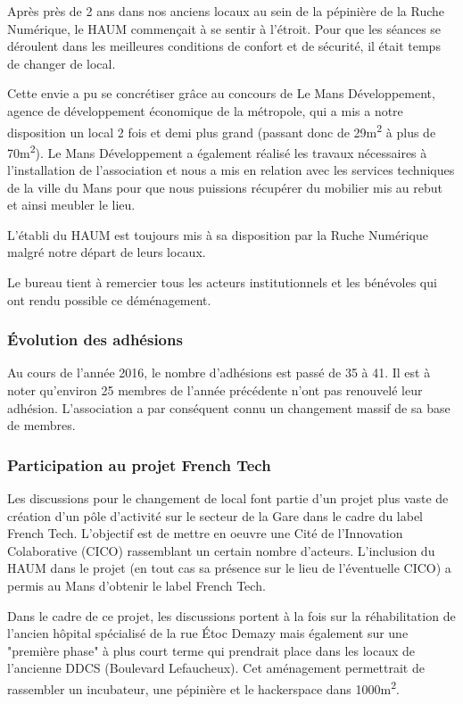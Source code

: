 \documentclass[11pt]{article}
\begin{document}
Après près de 2 ans dans nos anciens locaux au sein de la pépinière de la Ruche Numérique, le HAUM commençait à se sentir à l'étroit. Pour que les séances se déroulent dans les meilleures conditions de confort et de sécurité, il était temps de changer de local.

Cette envie a pu se concrétiser grâce au concours de Le Mans Développement, agence de développement économique de la métropole, qui a mis a notre disposition un local 2 fois et demi plus grand (passant donc de 29m\textsuperscript{2} à plus de 70m\textsuperscript{2}). Le Mans Développement a également réalisé les travaux nécessaires à l'installation de l'association et nous a mis en relation avec les services techniques de la ville du Mans pour que nous puissions récupérer du mobilier mis au rebut et ainsi meubler le lieu.

L'établi du HAUM est toujours mis à sa disposition par la Ruche Numérique malgré notre départ de leurs locaux.

Le bureau tient à remercier tous les acteurs institutionnels et les bénévoles qui ont rendu possible ce déménagement.

\subsubsection{Évolution des adhésions}

Au cours de l'année 2016, le nombre d'adhésions est passé de 35 à 41.
Il est à noter qu'environ 25 membres de l'année précédente n'ont pas renouvelé leur adhésion. L'association a par conséquent connu un changement massif de sa base de membres.

\subsubsection{Participation au projet French Tech}

Les discussions pour le changement de local font partie d'un projet plus vaste de création d'un pôle d'activité sur le secteur de la Gare dans le cadre du label French Tech. L'objectif est de mettre en oeuvre une Cité de l'Innovation Colaborative (CICO) rassemblant un certain nombre d'acteurs. L'inclusion du HAUM dans le projet (en tout cas sa présence sur le lieu de l'éventuelle CICO) a permis au Mans d'obtenir le label French Tech.

Dans le cadre de ce projet, les discussions portent à la fois sur la réhabilitation de l'ancien hôpital spécialisé de la rue Étoc Demazy mais également sur une "première phase" à plus court terme qui prendrait place dans les locaux de l'ancienne DDCS (Boulevard Lefaucheux). Cet aménagement permettrait de rassembler un incubateur, une pépinière et le hackerspace dans 1000m\textsuperscript{2}.
\end{document}
